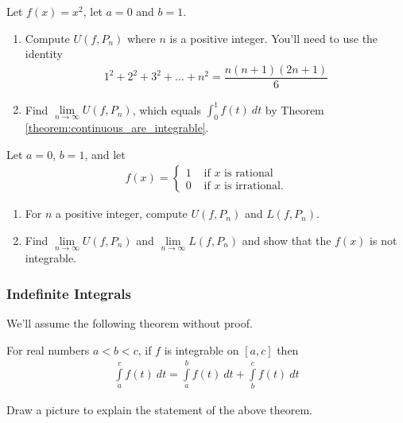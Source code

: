 \begin{exercise}
	Let $f(x) = x^2$, let $a=0$ and $b = 1$.
	\begin{enumerate}
		\item Compute $U(f,P_n)$ where $n$ is a positive integer. You'll need to use the identity
		      \begin{align*}
			      1^2 + 2^2 + 3^2 + \dots + n^2 = \dfrac{n(n+1)(2n+1)}{6}
		      \end{align*}
		\item Find $\lim \limits_{n \rightarrow \infty} U(f,P_n)$, which equals $\int_{0}^1 f(t) \: dt$ by Theorem \ref{theorem:continuous_are_integrable}.
	\end{enumerate}
\end{exercise}

\begin{exercise}
	Let $a = 0$, $b = 1$, and let
	\begin{align*}
		f(x) = \begin{cases}
			1 & \mbox{ if $x$ is rational}    \\
			0 & \mbox{ if $x$ is irrational.}
		\end{cases}
	\end{align*}
	\begin{enumerate}
		\item For $n$ a positive integer, compute $U(f,P_n)$ and $L(f,P_n)$.
		\item Find $\lim \limits_{n \rightarrow \infty} U(f,P_n)$ and $\lim \limits_{n \rightarrow \infty} L(f,P_n)$ and show that the $f(x)$ is not integrable.
	\end{enumerate}
\end{exercise}



\subsubsection{Indefinite Integrals}
We'll assume the following theorem without proof.
\begin{theorem}
	\label{theorem:integral_sum}
	For real numbers $a < b < c$, if $f$ is integrable on $[a,c]$ then
	\begin{align*}
		\int \limits_a ^c f(t) \: dt = \int \limits_a ^b f(t) \: dt  + \int \limits_b ^c f(t) \: dt
	\end{align*}
\end{theorem}
\begin{exercise}
	Draw a picture to explain the statement of the above theorem.
\end{exercise}

